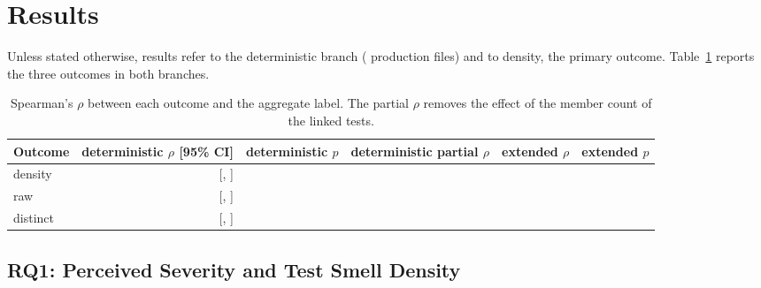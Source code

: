
\section{Results}
\label{sec:results}

Unless stated otherwise, results refer to the deterministic branch (\FarquivosDet{}
production files) and to density, the primary outcome. Table~\ref{tab:rq1} reports the
three outcomes in both branches.

\begin{table}[t]
  \centering
  \caption{Spearman's $\rho$ between each outcome and the aggregate label. The partial
  $\rho$ removes the effect of the member count of the linked tests.}
  \label{tab:rq1}
  \begin{tabular}{lrrrrr}
    \toprule
    Outcome & deterministic $\rho$ [95\% CI] & deterministic $p$ & deterministic partial $\rho$
      & extended $\rho$ & extended $p$ \\
    \midrule
    density & \FrhoDensidadeDet{} [\FicDensidadeBaixo{}, \FicDensidadeAlto{}] & \FpDensidadeDet{}
      & \FparcialDensidade{} & \FrhoDensidadeAmp{} & \FpDensidadeAmp{} \\
    raw & \FrhoBrutoDet{} [\FicBrutoBaixo{}, \FicBrutoAlto{}] & \FpBrutoDet{}
      & \FparcialBruto{} & \FrhoBrutoAmp{} & \FpBrutoAmp{} \\
    distinct & \FrhoDistintosDet{} [\FicDistintosBaixo{}, \FicDistintosAlto{}] & \FpDistintosDet{}
      & \FparcialDistintos{} & \FrhoDistintosAmp{} & \FpDistintosAmp{} \\
    \bottomrule
  \end{tabular}
\end{table}

\subsection{RQ1: Perceived Severity and Test Smell Density}
\label{sec:res-rq1}


